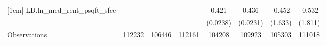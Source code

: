 {\begin{tabular}{l*{7}{c}}
[1em]
LD.ln_med_rent_psqft_sfcc&                  &                  &                  &    0.421\sym{***}&    0.436\sym{***}&   -0.452         &   -0.532         \\
          &                  &                  &                  & (0.0238)         & (0.0231)         &  (1.633)         &  (1.811)         \\
\hline
Observations&   112232         &   106446         &   112161         &   104208         &   109923         &   105303         &   111018         \\
\hline\hline
\end{tabular}
}
